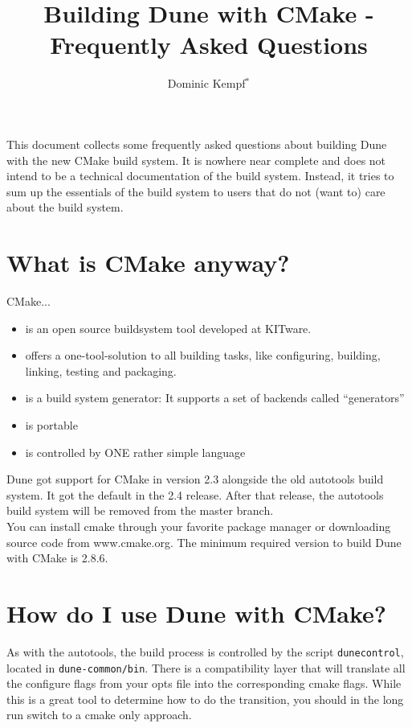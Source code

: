 \documentclass[a4paper,10pt]{scrartcl}
\title{Building Dune with CMake - Frequently Asked Questions}
\author{Dominic Kempf$^\ast$}
\begin{document}
\maketitle
\tableofcontents
\pagebreak

This document collects some frequently asked questions about building Dune with the new CMake build system. It is nowhere near complete and does not intend to be a technical documentation of the build system. Instead, it tries to sum up the essentials of the build system to users that do not (want to) care about the build system.

\section{What is CMake anyway?}
CMake...
 \begin{itemize}
  \item is an open source buildsystem tool developed at KITware.
  \item offers a one-tool-solution to all building tasks, like configuring, building, linking, testing and packaging.
  \item is a build system generator: It supports a set of backends called ``generators''
  \item is portable
  \item is controlled by ONE rather simple language
 \end{itemize}

Dune got support for CMake in version 2.3 alongside the old autotools build system. It got the default in the 2.4 release. After that release, the autotools build system will be removed from the master branch. \\

You can install cmake through your favorite package manager or downloading source code from www.cmake.org. The minimum required version to build Dune with CMake is 2.8.6.

\section{How do I use Dune with CMake?}

As with the autotools, the build process is controlled by the script \lstinline!dunecontrol!, located in \lstinline!dune-common/bin!. There is a compatibility layer that will translate all the configure flags from your opts file into the corresponding cmake flags. While this is a great tool to determine how to do the transition, you should in the long run switch to a cmake only approach. \\
\end{document}
